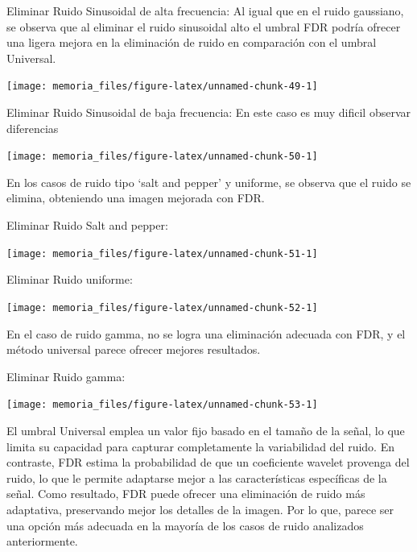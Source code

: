 \documentclass[
]{article}
\begin{document}
Eliminar Ruido Sinusoidal de alta frecuencia: Al igual que en el ruido
gaussiano, se observa que al eliminar el ruido sinusoidal alto el umbral
FDR podría ofrecer una ligera mejora en la eliminación de ruido en
comparación con el umbral Universal.

\begin{center}\texttt{[image: memoria\_files/figure-latex/unnamed-chunk-49-1]} \end{center}

Eliminar Ruido Sinusoidal de baja frecuencia: En este caso es muy
dificil observar diferencias

\begin{center}\texttt{[image: memoria\_files/figure-latex/unnamed-chunk-50-1]} \end{center}

En los casos de ruido tipo `salt and pepper' y uniforme, se observa que
el ruido se elimina, obteniendo una imagen mejorada con FDR.

Eliminar Ruido Salt and pepper:

\begin{center}\texttt{[image: memoria\_files/figure-latex/unnamed-chunk-51-1]} \end{center}

Eliminar Ruido uniforme:

\begin{center}\texttt{[image: memoria\_files/figure-latex/unnamed-chunk-52-1]} \end{center}

En el caso de ruido gamma, no se logra una eliminación adecuada con FDR,
y el método universal parece ofrecer mejores resultados.

Eliminar Ruido gamma:

\begin{center}\texttt{[image: memoria\_files/figure-latex/unnamed-chunk-53-1]} \end{center}

El umbral Universal emplea un valor fijo basado en el tamaño de la
señal, lo que limita su capacidad para capturar completamente la
variabilidad del ruido. En contraste, FDR estima la probabilidad de que
un coeficiente wavelet provenga del ruido, lo que le permite adaptarse
mejor a las características específicas de la señal. Como resultado, FDR
puede ofrecer una eliminación de ruido más adaptativa, preservando mejor
los detalles de la imagen. Por lo que, parece ser una opción más
adecuada en la mayoría de los casos de ruido analizados anteriormente.
\end{document}
